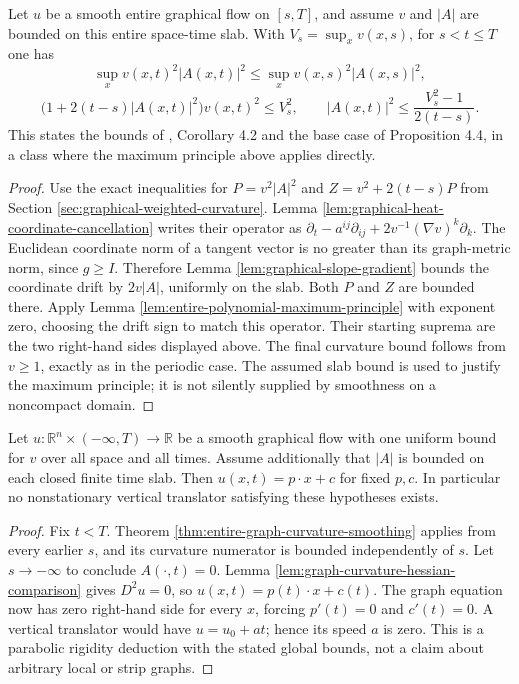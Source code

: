 \begin{theorem}\label{thm:entire-graph-curvature-smoothing}
Let $u$ be a smooth entire graphical flow on $[s,T]$, and assume $v$ and $|A|$ are bounded on this entire space-time slab. With $V_s=\sup_xv(x,s)$, for $s<t\leq T$ one has
\[
 \sup_x v(x,t)^2|A(x,t)|^2\leq\sup_xv(x,s)^2|A(x,s)|^2,
\]
\[
 \bigl(1+2(t-s)|A(x,t)|^2\bigr)v(x,t)^2\leq V_s^2,
 \qquad |A(x,t)|^2\leq\frac{V_s^2-1}{2(t-s)}.
\]
This states the bounds of \cite{EH89}, Corollary 4.2 and the base case of Proposition 4.4, in a class where the maximum principle above applies directly.
\end{theorem}
\begin{proof}
Use the exact inequalities for $P=v^2|A|^2$ and $Z=v^2+2(t-s)P$ from Section \ref{sec:graphical-weighted-curvature}. Lemma \ref{lem:graphical-heat-coordinate-cancellation} writes their operator as
$\partial_t-a^{ij}\partial_{ij}+2v^{-1}(\nabla v)^k\partial_k$.
The Euclidean coordinate norm of a tangent vector is no greater than its graph-metric norm, since $g\geq I$. Therefore Lemma \ref{lem:graphical-slope-gradient} bounds the coordinate drift by $2v|A|$, uniformly on the slab. Both $P$ and $Z$ are bounded there. Apply Lemma \ref{lem:entire-polynomial-maximum-principle} with exponent zero, choosing the drift sign to match this operator. Their starting suprema are the two right-hand sides displayed above. The final curvature bound follows from $v\geq1$, exactly as in the periodic case. The assumed slab bound is used to justify the maximum principle; it is not silently supplied by smoothness on a noncompact domain.
\end{proof}

\begin{corollary}\label{cor:ancient-entire-graph-rigidity}
Let $u:\mathbb R^n\times(-\infty,T)\to\mathbb R$ be a smooth graphical flow with one uniform bound for $v$ over all space and all times. Assume additionally that $|A|$ is bounded on each closed finite time slab. Then $u(x,t)=p\cdot x+c$ for fixed $p,c$. In particular no nonstationary vertical translator satisfying these hypotheses exists.
\end{corollary}
\begin{proof}
Fix $t<T$. Theorem \ref{thm:entire-graph-curvature-smoothing} applies from every earlier $s$, and its curvature numerator is bounded independently of $s$. Let $s\to-\infty$ to conclude $A(\cdot,t)=0$. Lemma \ref{lem:graph-curvature-hessian-comparison} gives $D^2u=0$, so $u(x,t)=p(t)\cdot x+c(t)$. The graph equation now has zero right-hand side for every $x$, forcing $p'(t)=0$ and $c'(t)=0$. A vertical translator would have $u=u_0+at$; hence its speed $a$ is zero. This is a parabolic rigidity deduction with the stated global bounds, not a claim about arbitrary local or strip graphs.
\end{proof}

